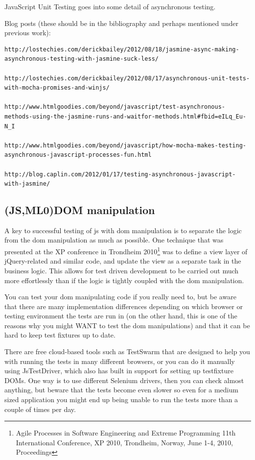 \documentclass[11pt]{article}
\begin{document}
JavaScript Unit Testing \cite{JSUT} goes into some detail of asynchronous testing.

Blog posts (these should be in the bibliography and perhaps mentioned under previous work):
\begin{verbatim}
http://lostechies.com/derickbailey/2012/08/18/jasmine-async-making-asynchronous-testing-with-jasmine-suck-less/

http://lostechies.com/derickbailey/2012/08/17/asynchronous-unit-tests-with-mocha-promises-and-winjs/

http://www.htmlgoodies.com/beyond/javascript/test-asynchronous-methods-using-the-jasmine-runs-and-waitfor-methods.html#fbid=eILq_Eu-N_I

http://www.htmlgoodies.com/beyond/javascript/how-mocha-makes-testing-asynchronous-javascript-processes-fun.html

http://blog.caplin.com/2012/01/17/testing-asynchronous-javascript-with-jasmine/
\end{verbatim}

\subsection{(JS,ML0)DOM manipulation}

A key to successful testing of \gls{js} with \gls{dom} manipulation is to separate the logic from the \gls{dom} manipulation as much as possible. One technique that was presented at the XP conference in Trondheim 2010\footnote{Agile Processes in Software Engineering and Extreme Programming 11th International Conference, XP 2010, Trondheim, Norway, June 1-4, 2010, Proceedings} was to define a view layer of jQuery-related and similar code, and update the view as a separate task in the business logic. This allows for test driven development to be carried out much more effortlessly than if the logic is tightly coupled with the \gls{dom} manipulation. \cite[question~4]{Ahnve}

You can test your \gls{dom} manipulating code if you really need to, but be aware that there are many implementation differences depending on which browser or testing environment the tests are run in (on the other hand, this is one of the reasons why you might WANT to test the \gls{dom} manipulations) and that it can be hard to keep test fixtures up to date.

There are free cloud-based tools such as TestSwarm that are designed to help you with running the tests in many different browsers, or you can do it manually using JsTestDriver, which also has built in support for setting up
\gls{testfixture} DOMs. One way is to use different Selenium drivers, then you can check almost anything, but beware that the tests become even slower so even for a medium sized application you might end up being unable to run the tests more than a couple of times per day.
\end{document}
